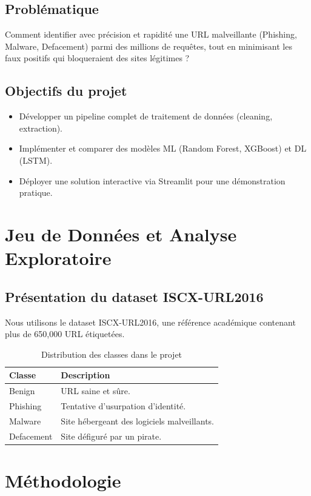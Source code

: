 \documentclass[12pt,a4paper]{article}
\begin{document}
\subsection{Problématique}
Comment identifier avec précision et rapidité une URL malveillante (Phishing, Malware, Defacement) parmi des millions de requêtes, tout en minimisant les faux positifs qui bloqueraient des sites légitimes ?

\subsection{Objectifs du projet}
\begin{itemize}
    \item Développer un pipeline complet de traitement de données (cleaning, extraction).
    \item Implémenter et comparer des modèles ML (Random Forest, XGBoost) et DL (LSTM).
    \item Déployer une solution interactive via Streamlit pour une démonstration pratique.
\end{itemize}

\section{Jeu de Données et Analyse Exploratoire}
\subsection{Présentation du dataset ISCX-URL2016}
Nous utilisons le dataset ISCX-URL2016, une référence académique contenant plus de 650,000 URL étiquetées.
\begin{table}[H]
\centering
\caption{Distribution des classes dans le projet}
\begin{tabular}{@{}ll@{}}
\toprule
\textbf{Classe} & \textbf{Description} \\ \midrule
Benign & URL saine et sûre. \\
Phishing & Tentative d'usurpation d'identité. \\
Malware & Site hébergeant des logiciels malveillants. \\
Defacement & Site défiguré par un pirate. \\ \bottomrule
\end{tabular}
\end{table}

\section{Méthodologie}
\end{document}
